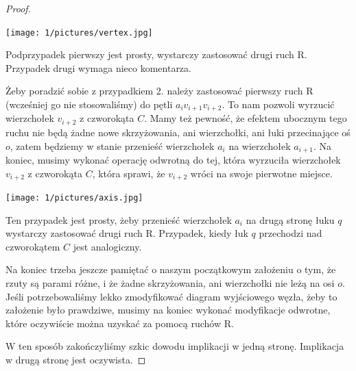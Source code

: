 \begin{proof}
	\begin{center}

	\texttt{[image: 1/pictures/vertex.jpg]}
	\end{center}

	
Podprzypadek pierwszy jest prosty, wystarczy zastosować drugi ruch R. Przypadek drugi wymaga nieco komentarza. 

Żeby poradzić sobie z przypadkiem 2. należy zastosować pierwszy ruch R (wcześniej go nie stosowaliśmy) do pętli $a_iv_{i+1}v_{i+2}$. To nam pozwoli wyrzucić wierzchołek $v_{i+2}$ z 
czworokąta $C$. Mamy też pewność, że efektem ubocznym tego ruchu nie będą żadne nowe skrzyżowania, ani wierzchołki, ani łuki przecinające oś $o$, zatem będziemy w stanie przenieść 
wierzchołek $a_i$ na wierzchołek $a_{i+1}$. Na koniec, musimy wykonać operację odwrotną do tej, która wyrzuciła wierzchołek $v_{i+2}$ z czworokąta $C$, która sprawi, że $v_{i+2}$
wróci na swoje pierwotne miejsce.


	\begin{center}

	\texttt{[image: 1/pictures/axis.jpg]}
	\end{center}

	
Ten przypadek jest prosty, żeby przenieść wierzchołek $a_i$ na drugą stronę łuku $q$ wystarczy zastosować drugi ruch R. Przypadek, kiedy łuk $q$ przechodzi nad czworokątem $C$ jest analogiczny.

Na koniec trzeba jeszcze pamiętać o naszym początkowym założeniu o tym, że rzuty są parami różne, i że żadne skrzyżowania, ani wierzchołki nie leżą na osi $o$. Jeśli potrzebowaliśmy
lekko zmodyfikować diagram wyjściowego węzła, żeby to założenie było prawdziwe, musimy na koniec wykonać modyfikacje odwrotne, które oczywiście można uzyskać za pomocą ruchów R.

W ten sposób zakończyliśmy szkic dowodu implikacji w jedną stronę. Implikacja w drugą stronę jest oczywista. 
	
\end{proof}